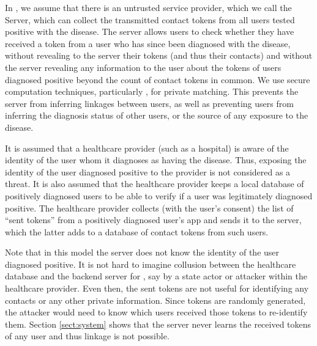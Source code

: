 In \dect, we assume that there is an untrusted service provider, which we call the \dect Server, which can collect the transmitted contact tokens from all users tested positive with the disease.
The \dect server allows users to check whether they have received a token from a user who has since been diagnosed with the disease, without revealing to the server their tokens (and thus their contacts) and without the server revealing any information to the user about the tokens of users diagnosed positive beyond the count of contact tokens in common. We use secure computation techniques, particularly \psica, for private matching. This prevents the \dect server from inferring linkages between users, as well as preventing users from inferring the diagnosis status of other users, or the source of any exposure to the disease.

It is assumed that a healthcare provider (such as a hospital)
is aware of the identity of the user whom it diagnoses as having the disease. Thus, exposing the identity of the user diagnosed positive to the provider is not considered as a threat. 
It is also assumed that the healthcare provider keeps a local database of positively diagnosed users to be able to verify if a user was legitimately diagnosed positive. The healthcare provider collects (with the user's consent) the list of ``sent tokens'' from a positively diagnosed user's app and sends it to the \dect server, which the latter adds to a database of contact tokens from such users.

Note that in this model the server does not know the identity of the user diagnosed positive. It is not hard to imagine collusion between the healthcare database and the backend server for \dect, say by a state actor or attacker within the healthcare provider. Even then, the sent tokens are not useful for identifying any contacts or any other private information. Since tokens are randomly generated, the attacker would need to know which users received those tokens to re-identify them. Section \ref{sect:system} shows that the \dect server never learns the received tokens of any user and thus linkage is not possible.



